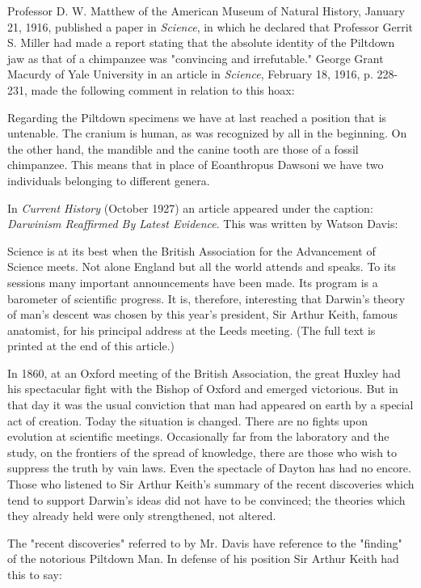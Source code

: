 Professor D. W. Matthew of the American Museum of Natural History, January 21, 1916,
published a paper in \textit{Science}, in which he declared that Professor Gerrit S. Miller had made a
report stating that the absolute identity of the Piltdown jaw as that of a chimpanzee was
"convincing and irrefutable." George Grant Macurdy of Yale University in an article in
\textit{Science}, February 18, 1916, p. 228-231, made the following comment in relation to this
hoax:

Regarding the Piltdown specimens we have at last reached a position that is untenable. The
cranium is human, as was recognized by all in the beginning. On the other hand, the
mandible and the canine tooth are those of a fossil chimpanzee. This means that in place of
Eoanthropus Dawsoni we have two individuals belonging to different genera.

In \textit{Current History} (October 1927) an article appeared under the caption: \textit{Darwinism
Reaffirmed By Latest Evidence}. This was written by Watson Davis:

Science is at its best when the British Association for the Advancement of Science meets.
Not alone England but all the world attends and speaks. To its sessions many important
announcements have been made. Its program is a barometer of scientific progress. It is,
therefore, interesting that Darwin's theory of man's descent was chosen by this year's
president, Sir Arthur Keith, famous anatomist, for his principal address at the Leeds meeting.
(The full text is printed at the end of this article.)

In 1860, at an Oxford meeting of the British Association, the great Huxley had his
spectacular fight with the Bishop of Oxford and emerged victorious. But in that day it was
the usual conviction that man had appeared on earth by a special act of creation. Today the
situation is changed. There are no fights upon evolution at scientific meetings. Occasionally
far from the laboratory and the study, on the frontiers of the spread of knowledge, there are
those who wish to suppress the truth by vain laws. Even the spectacle of Dayton has had no
encore. Those who listened to Sir Arthur Keith's summary of the recent discoveries which
tend to support Darwin's ideas did not have to be convinced; the theories which they already
held were only strengthened, not altered.

The "recent discoveries" referred to by Mr. Davis have reference to the "finding" of the
notorious Piltdown Man. In defense of his position Sir Arthur Keith had this to say:

